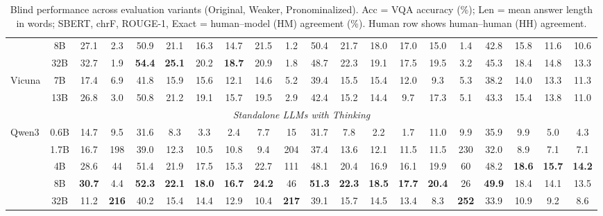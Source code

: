 \begin{table}[t]
{\begin{tabular}{lc|cccccc|cccccc|cccccc}
 & 8B & \cellcolor{gray!15}27.1 & 2.3 & 50.9 & 21.1 & 16.3 & 14.7 & \cellcolor{gray!15}21.5 & 1.2 & 50.4 & \cellcolor{gray!15}21.7 & 18.0 & \cellcolor{gray!15}17.0 & 15.0 & 1.4 & 42.8 & 15.8 & 11.6 & 10.6 \\
 & 32B & \cellcolor{gray!15}32.7 & 1.9 & \textbf{54.4} & \cellcolor{gray!15}\textbf{25.1} & \cellcolor{gray!15}20.2 & \cellcolor{gray!15}\textbf{18.7} & \cellcolor{gray!15}20.9 & 1.8 & 48.7 & \cellcolor{gray!15}22.3 & \cellcolor{gray!15}19.1 & \cellcolor{gray!15}17.5 & \cellcolor{gray!15}19.5 & 3.2 & 45.3 & 18.4 & 14.8 & 13.3 \\
\multirow{2}{*}{Vicuna} & 7B & 17.4 & 6.9 & 41.8 & 15.9 & 15.6 & 12.1 & 14.6 & 5.2 & 39.4 & 15.5 & 15.4 & 12.0 & 9.3 & 5.3 & 38.2 & 14.0 & 13.3 & 11.3 \\
 & 13B & \cellcolor{gray!15}26.8 & 3.0 & 50.8 & 21.2 & \cellcolor{gray!15}19.1 & 15.7 & \cellcolor{gray!15}19.5 & 2.9 & 42.4 & 15.2 & 14.4 & 9.7 & \cellcolor{gray!15}17.3 & 5.1 & 43.3 & 15.4 & 13.8 & 11.0 \\
\midrule
\multicolumn{20}{c}{\textit{Standalone LLMs with Thinking}} \\
\midrule
\multirow{5}{*}{Qwen3} & 0.6B & 14.7 & 9.5 & 31.6 & 8.3 & 3.3 & 2.4 & 7.7 & 15 & 31.7 & 7.8 & 2.2 & 1.7 & 11.0 & 9.9 & 35.9 & 9.9 & 5.0 & 4.3 \\
 & 1.7B & 16.7 & 198 & 39.0 & 12.3 & 10.5 & 10.8 & 9.4 & 204 & 37.4 & 13.6 & 12.1 & 11.5 & 11.5 & 230 & 32.0 & 8.9 & 7.1 & 7.1 \\
 & 4B & \cellcolor{gray!15}28.6 & 44 & 51.4 & 21.9 & 17.5 & 15.3 & \cellcolor{gray!15}22.7 & 111 & 48.1 & 20.4 & 16.9 & 16.1 & \cellcolor{gray!15}19.9 & 60 & 48.2 & \textbf{18.6} & \textbf{15.7} & \textbf{14.2} \\
 & 8B & \cellcolor{gray!15}\textbf{30.7} & 4.4 & \textbf{52.3} & \textbf{22.1} & \textbf{18.0} & \textbf{16.7} & \cellcolor{gray!15}\textbf{24.2} & 46 & \textbf{51.3} & \cellcolor{gray!15}\textbf{22.3} & \cellcolor{gray!15}\textbf{18.5} & \cellcolor{gray!15}\textbf{17.7} & \cellcolor{gray!15}\textbf{20.4} & 26 & \textbf{49.9} & 18.4 & 14.1 & 13.5 \\
 & 32B & 11.2 & \textbf{216} & 40.2 & 15.4 & 14.4 & 12.9 & 10.4 & \textbf{217} & 39.1 & 15.7 & 14.5 & 13.4 & 8.3 & \textbf{252} & 33.9 & 10.9 & 9.2 & 8.6 \\
\bottomrule
\end{tabular}
}
\caption{\small Blind performance across evaluation variants (Original, Weaker, Pronominalized). Acc = VQA accuracy (\%); Len = mean answer length in words; SBERT, chrF, ROUGE-1, Exact = human--model (HM) agreement (\%). Human row shows human--human (HH) agreement.}
\label{tab:comprehensive_inst_blind}
\end{table}
